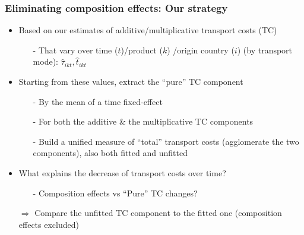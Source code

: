 \documentclass[10 pt,Helvetica, french]{beamer}
\begin{document}
\begin{frame} [label = slide_compeffects_strategy]
\frametitle{Eliminating composition effects: Our strategy}
\begin{itemize}
\item Based on our estimates of additive/multiplicative transport costs (TC) \hyperlink{app_compeffects_strategy}{}\vspace{0.1cm}
\begin{itemize}
\item[-] That vary over time ($t$)/product ($k$) /origin country ($i$) (by transport mode): $\widehat{\tau}_{ikt}, \widehat{t}_{ikt}$ \vspace{0.1cm}
\end{itemize}
\item Starting from these values, extract the ``pure'' TC component \hyperlink{app_compeffects_details1}{}\vspace{0.1cm}
\begin{itemize}
\item[-] By the mean of a time fixed-effect \vspace{0.1cm}
\item[-] For both the additive \& the multiplicative TC components \vspace{0.1cm}
\item[-] Build a unified measure of ``total'' transport costs (agglomerate the two components), also both fitted and unfitted \vspace{0.2cm}
\end{itemize}
\item What explains the decrease of transport costs over time?  \vspace{0.1cm}
\begin{itemize}
\item[-] Composition effects vs ``Pure'' TC changes? \vspace{0.1cm}
\end{itemize}
\item[$\Rightarrow$] Compare the unfitted TC component to the fitted one (composition effects excluded) \vspace{0.1cm}
\end{itemize}
\end{frame}
\end{document}
